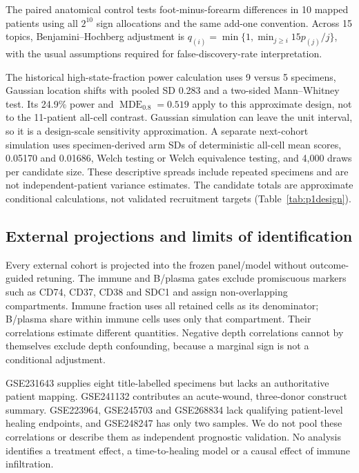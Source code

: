 The paired anatomical control tests foot-minus-forearm differences in 10 mapped patients using all $2^{10}$ sign allocations and the same add-one convention. Across 15 topics, Benjamini--Hochberg adjustment is $q_{(i)}=\min\{1,\min_{j\geq i}15p_{(j)}/j\}$, with the usual assumptions required for false-discovery-rate interpretation.

The historical high-state-fraction power calculation uses 9 versus 5 specimens, Gaussian location shifts with pooled SD 0.283 and a two-sided Mann--Whitney test. Its 24.9\% power and $\operatorname{MDE}_{0.8}=0.519$ apply to this approximate design, not to the 11-patient all-cell contrast. Gaussian simulation can leave the unit interval, so it is a design-scale sensitivity approximation. A separate next-cohort simulation uses specimen-derived arm SDs of deterministic all-cell mean scores, 0.05170 and 0.01686, Welch testing or Welch equivalence testing, and 4,000 draws per candidate size. These descriptive spreads include repeated specimens and are not independent-patient variance estimates. The candidate totals are approximate conditional calculations, not validated recruitment targets (Table~\ref{tab:p1design}).

\subsection{External projections and limits of identification}
Every external cohort is projected into the frozen panel/model without outcome-guided retuning. The immune and B/plasma gates exclude promiscuous markers such as CD74, CD37, CD38 and SDC1 and assign non-overlapping compartments. Immune fraction uses all retained cells as its denominator; B/plasma share within immune cells uses only that compartment. Their correlations estimate different quantities. Negative depth correlations cannot by themselves exclude depth confounding, because a marginal sign is not a conditional adjustment.

GSE231643 supplies eight title-labelled specimens but lacks an authoritative patient mapping. GSE241132 contributes an acute-wound, three-donor construct summary. GSE223964, GSE245703 and GSE268834 lack qualifying patient-level healing endpoints, and GSE248247 has only two samples. We do not pool these correlations or describe them as independent prognostic validation. No analysis identifies a treatment effect, a time-to-healing model or a causal effect of immune infiltration.


